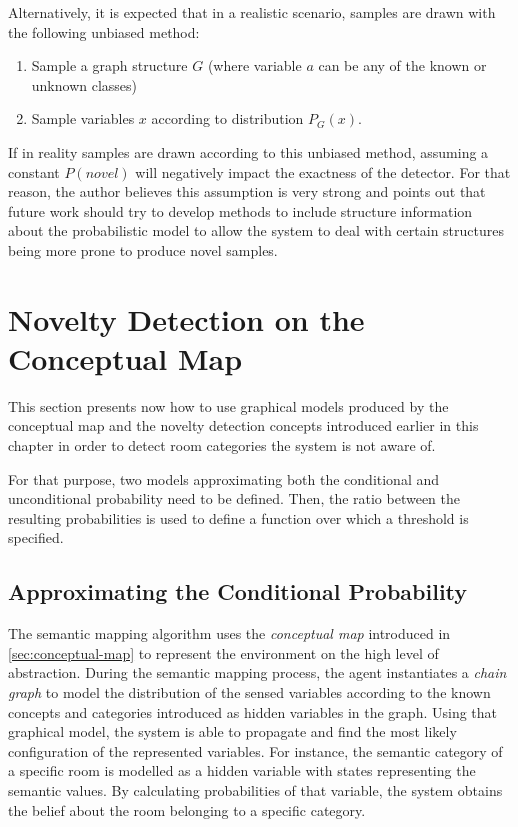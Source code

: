 Alternatively, it is expected that in a realistic scenario, samples are drawn with the following
unbiased method:
\begin{algorithm}
\begin{enumerate}
\item Sample a graph structure $G$ (where variable $a$ can be any of the known or unknown classes)
\item Sample variables $x$ according to distribution $P_G(x)$.
\end{enumerate}
\end{algorithm}

If in reality samples are drawn according to this unbiased method, assuming a constant $P(novel)$
will negatively impact the exactness of the detector. For that reason, the author believes this assumption
is very strong and points out that future work should try to develop methods to include structure information
about the probabilistic model to allow the system to deal with certain structures being more prone to produce
novel samples.

 
\section{Novelty Detection on the Conceptual Map}

This section presents now how to use graphical models produced by the conceptual map and the
novelty detection concepts introduced earlier in this chapter in order to detect room categories the
system is not aware of.

For that purpose, two models approximating both the conditional and unconditional probability need to
be defined. Then, the ratio between the resulting probabilities is used to define a function over which 
a threshold is specified.

\subsection{Approximating the Conditional Probability}
The semantic mapping algorithm uses the \emph{conceptual map}
introduced in \autoref{sec:conceptual-map} to represent the environment on the high level of abstraction. 
During the semantic mapping process, the agent instantiates a
\emph{chain graph} to model the distribution of the sensed variables according to the known
concepts and categories introduced as hidden variables in the graph. Using that graphical model,
the system is able to propagate and find the most likely configuration of the represented
variables. For instance, the semantic category of a specific room is modelled as a hidden variable
with states representing the semantic values. By calculating probabilities of that variable, the
system obtains the belief about the room belonging to a specific category.

